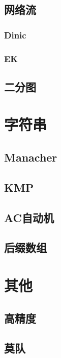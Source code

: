 \documentclass[12pt,a4paper]{article}
\begin{document}
\subsection{网络流}
\subsubsection{Dinic}
\begin{spacing}{1.5}

\end{spacing}

\subsubsection{EK}

\subsection{二分图}
\section{字符串}
\subsection{Manacher}

\subsection{KMP}

\subsection{AC自动机}
\subsection{后缀数组}
\section{其他}
\subsection{高精度}

\subsection{莫队}
\end{document}
